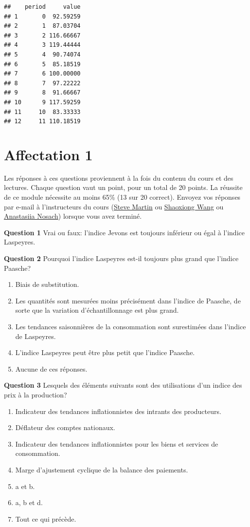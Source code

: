 \documentclass[
]{article}
\begin{document}
\begin{verbatim}
##    period     value
## 1       0  92.59259
## 2       1  87.03704
## 3       2 116.66667
## 4       3 119.44444
## 5       4  90.74074
## 6       5  85.18519
## 7       6 100.00000
## 8       7  97.22222
## 9       8  91.66667
## 10      9 117.59259
## 11     10  83.33333
## 12     11 110.18519
\end{verbatim}

\hypertarget{affectation-1}{%
\section{Affectation 1}\label{affectation-1}}

Les réponses à ces questions proviennent à la fois du contenu du cours et des lectures. Chaque question vaut un point, pour un total de 20 points. La réussite de ce module nécessite au moins 65\% (13 sur 20 correct). Envoyez vos réponses par e-mail à l'instructeurs du cours (\href{mailto:steve.martin5@canada.ca}{Steve Martin} ou \href{mailto:shaoxiong.wang@canada.ca}{Shaoxiong Wang} ou \href{mailto:anastasiia.nosach@canada.ca}{Anastasiia Nosach}) lorsque vous avez terminé.

\textbf{Question 1} Vrai ou faux: l'indice Jevons est toujours inférieur ou égal à l'indice Laspeyres.

\textbf{Question 2} Pourquoi l'indice Laspeyres est-il toujours plus grand que l'indice Paasche?

\begin{enumerate}
\def\labelenumi{\alph{enumi})}
\item
  Biais de substitution.
\item
  Les quantités sont mesurées moins précisément dans l'indice de Paasche, de sorte que la variation d'échantillonnage est
  plus grand.
\item
  Les tendances saisonnières de la consommation sont surestimées dans l'indice de Laspeyres.
\item
  L'indice Laspeyres peut être plus petit que l'indice Paasche.
\item
  Aucune de ces réponses.
\end{enumerate}

\textbf{Question 3} Lesquels des éléments suivants sont des utilisations d'un indice des prix à la production?

\begin{enumerate}
\def\labelenumi{\alph{enumi})}
\item
  Indicateur des tendances inflationnistes des intrants des producteurs.
\item
  Déflateur des comptes nationaux.
\item
  Indicateur des tendances inflationnistes pour les biens et services de consommation.
\item
  Marge d'ajustement cyclique de la balance des paiements.
\item
  a et b.
\item
  a, b et d.
\item
  Tout ce qui précède.
\end{enumerate}
\end{document}
